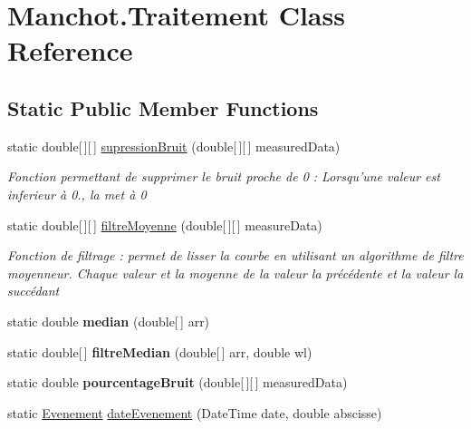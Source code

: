 \hypertarget{class_manchot_1_1_traitement}{\section{Manchot.\+Traitement Class Reference}
\label{class_manchot_1_1_traitement}
}
\subsection*{Static Public Member Functions}
\begin{DoxyCompactItemize}
\item 
static double\mbox{[}$\,$\mbox{]}\mbox{[}$\,$\mbox{]} \hyperlink{class_manchot_1_1_traitement_afedd59a6201aa10f4c57d332efd86407}{supression\+Bruit} (double\mbox{[}$\,$\mbox{]}\mbox{[}$\,$\mbox{]} measured\+Data)
\begin{DoxyCompactList}\small\item\em Fonction permettant de supprimer le bruit proche de 0 \+: Lorsqu'une valeur est inferieur à 0., la met à 0 \end{DoxyCompactList}\item 
static double\mbox{[}$\,$\mbox{]}\mbox{[}$\,$\mbox{]} \hyperlink{class_manchot_1_1_traitement_aa0d655f8bef3619bdfc36ea4fd47d6e7}{filtre\+Moyenne} (double\mbox{[}$\,$\mbox{]}\mbox{[}$\,$\mbox{]} measure\+Data)
\begin{DoxyCompactList}\small\item\em Fonction de filtrage \+: permet de lisser la courbe en utilisant un algorithme de filtre moyenneur. Chaque valeur et la moyenne de la valeur la précédente et la valeur la succédant \end{DoxyCompactList}\item 
\hypertarget{class_manchot_1_1_traitement_a59f8016b30fb1b50dd4e1c59db6854b1}{static double {\bfseries median} (double\mbox{[}$\,$\mbox{]} arr)}\label{class_manchot_1_1_traitement_a59f8016b30fb1b50dd4e1c59db6854b1}

\item 
\hypertarget{class_manchot_1_1_traitement_aed43f620f20d15a68db0f31ef11e7b78}{static double\mbox{[}$\,$\mbox{]} {\bfseries filtre\+Median} (double\mbox{[}$\,$\mbox{]} arr, double wl)}\label{class_manchot_1_1_traitement_aed43f620f20d15a68db0f31ef11e7b78}

\item 
\hypertarget{class_manchot_1_1_traitement_a36afab1b1bb57a7bc320d761c7654cda}{static double {\bfseries pourcentage\+Bruit} (double\mbox{[}$\,$\mbox{]}\mbox{[}$\,$\mbox{]} measured\+Data)}\label{class_manchot_1_1_traitement_a36afab1b1bb57a7bc320d761c7654cda}

\item 
static \hyperlink{class_manchot_1_1_evenement}{Evenement} \hyperlink{class_manchot_1_1_traitement_aa07e00505b10ae01c11fcfa6d62da67f}{date\+Evenement} (Date\+Time date, double abscisse)
\end{DoxyCompactItemize}


